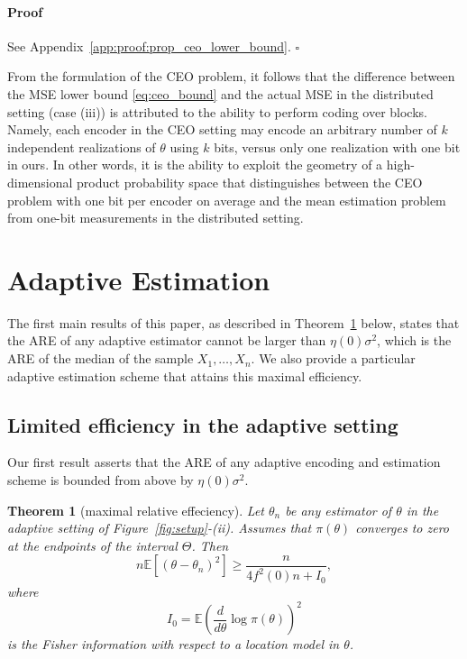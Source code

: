 \documentclass[letterpaper, 11pt]{IEEEtran}      %
\newtheorem{thm}{\bf{Theorem}}
\newenvironment{proof}{\paragraph*{Proof}}{\hfill$\square$ \newline}
\begin{document}
\begin{proof}
See Appendix~\ref{app:proof:prop_ceo_lower_bound}.
\end{proof}

From the formulation of the CEO problem, it follows that the difference between the MSE lower bound \eqref{eq:ceo_bound} and the actual MSE in the distributed setting (case (iii)) is attributed to the ability to perform coding over blocks. Namely, each encoder in the CEO setting may encode an arbitrary number of $k$ independent realizations of $\theta$ using $k$ bits, versus only one realization with one bit in ours. In other words, it is the ability to exploit the geometry of a high-dimensional product probability space that distinguishes between the CEO problem with one bit per encoder on average and the mean estimation problem from one-bit measurements in the distributed setting. 

\section{Adaptive Estimation \label{sec:sequential}}
The first main results of this paper, as described in Theorem~\ref{thm:adpative_lower_bound} below, states that the ARE of any adaptive estimator cannot be larger than $\eta(0)\sigma^2$, which is the ARE of the median of the sample $X_1,\ldots,X_n$. We also provide a particular adaptive estimation scheme that attains this maximal efficiency. %

\subsection{Limited efficiency in the adaptive setting}
Our first result asserts that the ARE of any adaptive encoding and estimation scheme is bounded from above by $\eta(0)\sigma^2$. %
\begin{thm}[maximal relative effeciency] \label{thm:adpative_lower_bound}
Let ${\theta}_n$ be any estimator of $\theta$ in the adaptive setting of Figure~\ref{fig:setup}-(ii). Assumes that $\pi(\theta)$ converges to zero at the endpoints of the interval $\Theta$. Then
\[
n\mathbb E\left[ (\theta-{\theta}_n)^2 \right] \geq   \frac{n}{ 4f^2(0) n + I_0},
\]
where 
\[
I_0 = \mathbb E \left( \frac{d}{d\theta} \log \pi (\theta) \right)^2
\]
is the Fisher information with respect to a location model in $\theta$. 
\end{thm}
\end{document}
